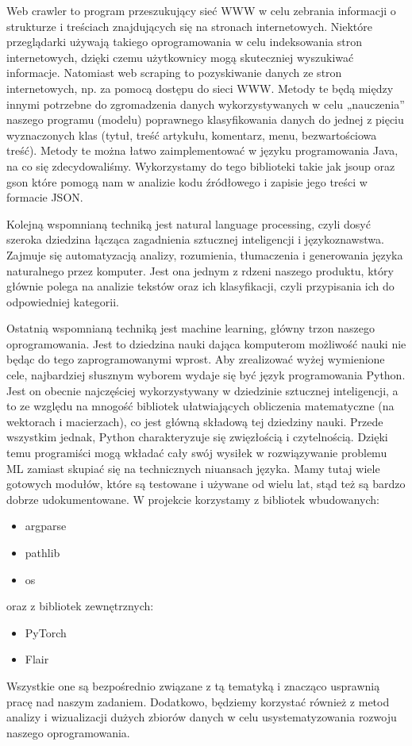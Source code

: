 Web crawler to program przeszukujący sieć WWW w celu zebrania informacji o strukturze i treściach znajdujących się na stronach internetowych. Niektóre przeglądarki używają takiego oprogramowania w celu indeksowania stron internetowych, dzięki czemu użytkownicy mogą skuteczniej wyszukiwać informacje. 
Natomiast web scraping to pozyskiwanie danych ze stron internetowych, np. za pomocą dostępu do sieci WWW. Metody te będą między innymi potrzebne do zgromadzenia danych wykorzystywanych w celu „nauczenia” naszego programu (modelu) poprawnego klasyfikowania danych do jednej z pięciu wyznaczonych klas (tytuł, treść artykułu, komentarz, menu, bezwartościowa treść). Metody te można łatwo zaimplementować w języku programowania Java, na co się zdecydowaliśmy. Wykorzystamy do tego biblioteki takie jak jsoup oraz gson które pomogą nam w analizie kodu źródłowego i zapisie jego treści w formacie JSON.

Kolejną wspomnianą techniką jest natural language processing, czyli dosyć szeroka dziedzina łącząca zagadnienia sztucznej inteligencji i językoznawstwa. Zajmuje się automatyzacją analizy, rozumienia, tłumaczenia i generowania języka naturalnego przez komputer. Jest ona jednym z rdzeni naszego produktu, który głównie polega na analizie tekstów oraz ich klasyfikacji, czyli przypisania ich do odpowiedniej kategorii. 

Ostatnią wspomnianą techniką jest machine learning, główny trzon naszego oprogramowania. Jest to dziedzina nauki dająca komputerom możliwość nauki nie będąc do tego zaprogramowanymi wprost.  Aby zrealizować wyżej wymienione cele, najbardziej słusznym wyborem wydaje się być język programowania Python. Jest on obecnie najczęściej wykorzystywany w dziedzinie sztucznej inteligencji, a to ze względu na mnogość bibliotek ułatwiających obliczenia matematyczne (na wektorach i macierzach), co jest główną składową tej dziedziny nauki. Przede wszystkim jednak, Python charakteryzuje się zwięzłością i czytelnością. Dzięki temu programiści mogą wkładać cały swój wysiłek w rozwiązywanie problemu ML zamiast skupiać się na technicznych niuansach języka. Mamy tutaj wiele gotowych modułów, które są testowane i używane od wielu lat, stąd też są bardzo dobrze udokumentowane. W projekcie korzystamy z bibliotek wbudowanych:
\begin{itemize}
\item argparse
\item pathlib
\item os
\end{itemize} 
oraz z bibliotek zewnętrznych:
\begin{itemize}
\item PyTorch
\item Flair
\end{itemize} 
Wszystkie one są bezpośrednio związane z tą tematyką i znacząco usprawnią pracę nad naszym zadaniem. Dodatkowo, będziemy korzystać również z metod analizy i wizualizacji dużych zbiorów danych w celu usystematyzowania rozwoju naszego oprogramowania.

